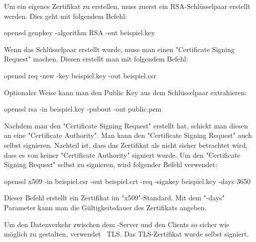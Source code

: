 
Um ein eigenes Zertifikat zu erstellen, muss zuerst ein RSA-Schlüsselpaar erstellt werden. Dies geht mit folgendem Befehl:

{\ttfamily openssl genpkey -algorithm RSA -out beispiel.key}

Wenn das Schlüsselpaar erstellt wurde, muss man einen "Certificate Signing Request" machen. Diesen erstellt man mit folgendem Befehl: 

{\ttfamily openssl req -new -key beispiel.key -out beispiel.csr}

Optionaler Weise kann man den Public Key aus dem Schlüsselpaar extrahieren:

{\ttfamily openssl rsa -in beispiel.key -pubout -out public.pem}

Nachdem man den "Certificate Signing Request" erstellt hat, schickt man diesen an eine "Certificate Authority". Man kann den "Certificate Signing Request" auch selbst signieren. Nachteil ist, dass das Zertifikat als nicht sicher betrachtet wird, dass es von keiner "Certificate Authority" signiert wurde. Um den "Certificate Signing Request" selbst zu signieren, wird folgender Befehl verwendet: 

{\ttfamily openssl x509 -in beispiel.csr -out beispiel.crt -req -signkey beispiel.key -days 3650}

Dieser Befehl erstellt ein Zertifikat im "x509"-Standard. Mit dem "-days" Parameter kann man die Gültigkeitsdauer des Zertifikats angeben.


Um den Datenverkehr zwischen dem \ZELIA-Server und den Clients so sicher wie möglich zu gestalten, verwendet \ZELIA\ TLS. Das TLS-Zertifikat wurde selbst signiert.
